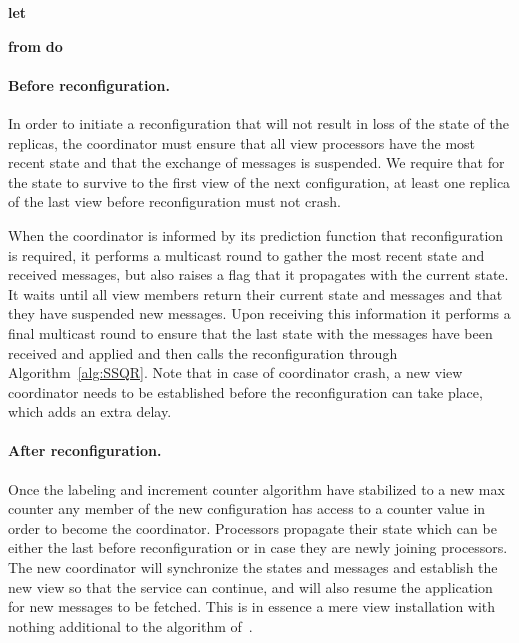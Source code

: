 \documentclass[11pt]{article}
\begin{document}
\begin{algorithm*}[t!]
\begin{footnotesize}
{






{\bf let}                      

\lForEach{  }{} 
} 

  {\bf from}  {\bf do} \; 


\end{footnotesize}
\end{algorithm*}




\paragraph{Before reconfiguration.}
In order to initiate a reconfiguration that will not result in loss of the state of the replicas, the coordinator must ensure that all view processors have the most recent state and that the exchange of messages is suspended.
We require that for the state to survive to the first view of the next configuration, at least one replica 
of the last view before reconfiguration must not crash. 


When the coordinator is informed by its prediction function that reconfiguration is required, it performs a multicast round to gather the most recent state and received messages, but also raises a  flag that it propagates with the current state. 
It waits until all view members return their current state and messages and that they have suspended new messages.
Upon receiving this information it performs a final multicast round to ensure that the last state with the messages have been received and applied and then calls the reconfiguration through Algorithm~\ref{alg:SSQR}. 
Note that in case of coordinator crash, a new view coordinator needs to be established before the reconfiguration can take place, which adds an extra delay.





\paragraph{After reconfiguration.}
Once the labeling and increment counter algorithm have stabilized to a new max counter any member of the new configuration has access to a counter value in order to become the coordinator.
Processors propagate their state which can be either the last before reconfiguration or  in case they are newly joining processors.
The new coordinator will synchronize the states and messages and establish the new view so that the service can continue, and will also resume the application for new messages to be fetched.
This is in essence a mere view installation with nothing additional to the algorithm of~\cite{SSVS}.
\end{document}
